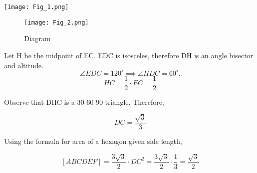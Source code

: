 \documentclass[11pt, letterpaper]{article}
\begin{document}










\begin{solution}{1} 

\centering
\texttt{[image: Fig\_1.png]}


\end{solution}


\begin{solution}{2}

\begin{figure}
    \centering
    \texttt{[image: Fig\_2.png]}
    \caption{Diagram}
\end{figure}
\break
Let H be the midpoint of EC. EDC is isosceles, therefore DH is an angle bisector and altitude. $$\angle EDC = 120^{\circ} \implies \angle HDC = 60^{\circ}.$$
$$HC = \frac{1}{2} \cdot EC = \frac{1}{2}$$ 

Observe that DHC is a 30-60-90 triangle. Therefore,

$$DC = \frac{\sqrt{3}}{3}$$

Using the formula for area of a hexagon given side length, 

$$[ABCDEF] = \frac{3\sqrt{3}}{2}\cdot DC^2 = \frac{3\sqrt{3}}{2}\cdot \frac{1}{3} = \boxed{\frac{\sqrt{3}}{2}}$$

\end{solution}
\end{document}
